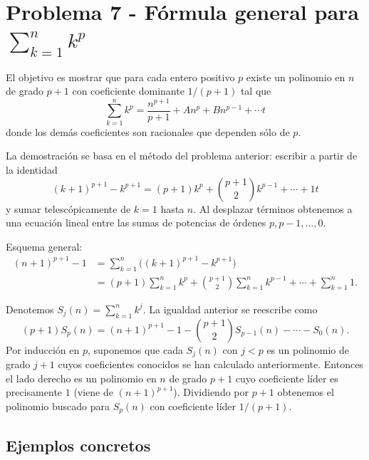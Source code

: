 
\section*{Problema 7 - Fórmula general para $\sum_{k=1}^n k^p$}

El objetivo es mostrar que para cada entero positivo $p$ existe un polinomio
en $n$ de grado $p+1$ con coeficiente dominante $1/(p+1)$ tal que
\[
\sum_{k=1}^n k^p = \frac{n^{p+1}}{p+1} + A n^p + B n^{p-1}+\cdots
t\]
donde los demás coeficientes son racionales que dependen sólo de $p$.

La demostración se basa en el método del problema anterior: escribir
a partir de la identidad
\[
(k+1)^{p+1}-k^{p+1} = (p+1)k^p + \binom{p+1}{2}k^{p-1} + \cdots + 1
t\]
y sumar telescópicamente de $k=1$ hasta $n$. Al desplazar términos obtenemos
a una ecuación lineal entre las sumas de potencias de órdenes $p,p-1,\dots,0$.

Esquema general:
\begin{align*}
(n+1)^{p+1}-1 &= \sum_{k=1}^n\big((k+1)^{p+1}-k^{p+1}\big) \\
&= (p+1)\sum_{k=1}^n k^p + \binom{p+1}{2}\sum_{k=1}^n k^{p-1} + \cdots + \sum_{k=1}^n1.
\end{align*}

Denotemos $S_j(n)=\sum_{k=1}^n k^j$. La igualdad anterior se reescribe como
\[
(p+1)S_p(n) = (n+1)^{p+1}-1 - \binom{p+1}{2}S_{p-1}(n) - \cdots - S_0(n).
\]
Por inducción en $p$, suponemos que cada $S_j(n)$ con $j<p$ es un polinomio de
grado $j+1$ cuyos coeficientes conocidos se han calculado anteriormente.
Entonces el lado derecho es un polinomio en $n$ de grado $p+1$ cuyo
coeficiente líder es precisamente $1$ (viene de $(n+1)^{p+1}$). Dividiendo
por $p+1$ obtenemos el polinomio buscado para $S_p(n)$ con coeficiente
líder $1/(p+1)$.

\subsection*{Ejemplos concretos}

